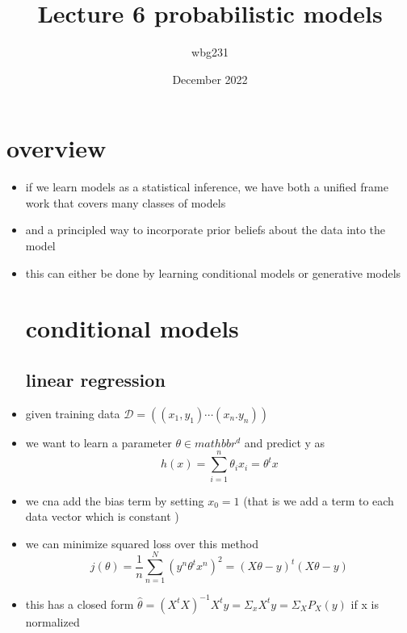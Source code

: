 \documentclass{article}
\title{Lecture 6 probabilistic models }
\author{wbg231 }
\date{December 2022}
\begin{document}
\maketitle
\section{overview}
\begin{itemize}
\item if we learn models as a statistical inference, we have both a unified frame work that covers many classes of models 
\item  and a  principled way to incorporate prior beliefs about the data into the model 
\item this can either be done by learning conditional models or generative models
\section*{conditional models}
\subsection*{linear regression}
\item given training data $\mathcal{D}=((x_1,y_1)\cdots (x_n.y_n))$
\item we want to learn a parameter $\theta \in mathbb{r}^{d}$ and predict y as $$h(x)=\sum_{i=1}^{n}\theta_ix_i= \theta^{t}x$$
\item we cna add the bias term by setting $x_0=1$ (that is we add a term to each data vector which is constant )
\item we can minimize squared loss over this method $$j(\theta)=\frac{1}{n}\sum_{n=1}^{N}(y^n\theta^{t}x^n)^2=(X\theta-y)^{t}(X\theta-y)$$ 
\item this has a closed form  $\hat{\theta}= (X^tX)^{-1}X^ty=\Sigma_{x}X^{t}y=\Sigma_{X}P_{X}(y)$ if x is normalized 

\end{itemize}
\end{document}

